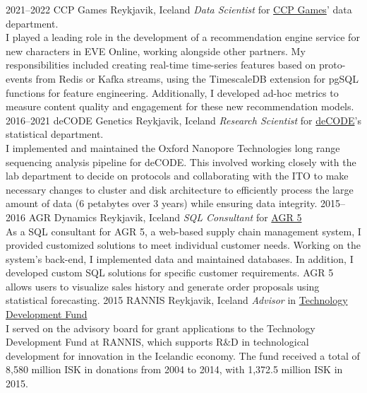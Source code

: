 \documentclass[]{cv} %
\begin{document}
\begin{entrylist}
\entry
{2021--2022}
{CCP Games}
{Reykjavik, Iceland}
{\emph{Data Scientist} for
	\href{https://www.ccpgames.com/}{CCP Games}' data department.\\
I played a leading role in the development of a recommendation engine service for new characters in EVE Online, working alongside other partners. My responsibilities included creating real-time time-series features based on proto-events from Redis or Kafka streams, using the TimescaleDB extension for pgSQL functions for feature engineering. Additionally, I developed ad-hoc metrics to measure content quality and engagement for these new recommendation models.
}
\entry
{2016--2021}
{deCODE Genetics}
{Reykjavik, Iceland}
{\emph{Research Scientist} for
    \href{https://www.decode.com/}{deCODE}'s statistical department.\\
    I implemented and maintained the Oxford Nanopore Technologies long range sequencing analysis pipeline for deCODE. This involved working closely with the lab department to decide on protocols and collaborating with the ITO to make necessary changes to cluster and disk architecture to efficiently process the large amount of data (6 petabytes over 3 years) while ensuring data integrity. 
}
\entry
{2015--2016}
{AGR Dynamics}
{Reykjavik, Iceland}
{\emph{SQL Consultant} for
    \href{http://agrdynamics.com/}{AGR 5}\\
As a SQL consultant for AGR 5, a web-based supply chain management system, I provided customized solutions to meet individual customer needs. Working on the system's back-end, I implemented data and maintained databases. In addition, I developed custom SQL solutions for specific customer requirements. AGR 5 allows users to visualize sales history and generate order proposals using statistical forecasting.
}    
\entry
{2015}
{RANNIS}
{Reykjavik, Iceland}
{\emph{Advisor} in 
\href{http://www.rannis.is/sjodir/rannsoknir/taeknithrounarsjodur/fagrad/}{Technology
 Development Fund}\\
I served on the advisory board for grant applications to the Technology Development Fund at RANNIS, which supports R\&D in technological development for innovation in the Icelandic economy. The fund received a total of 8,580 million ISK in donations from 2004 to 2014, with 1,372.5 million ISK in 2015.
}
\end{entrylist}
\end{document}
